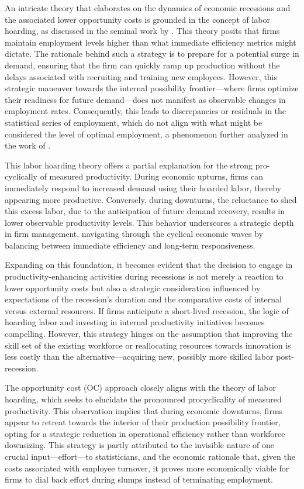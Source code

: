 \documentclass[12pt]{report}
\begin{document}
An intricate theory that elaborates on the dynamics of economic recessions and the associated lower opportunity costs is
grounded in the concept of labor hoarding, as discussed in the seminal work by  \cite{Cla73}. This theory posits
that firms maintain employment levels higher than what immediate efficiency metrics might dictate. The rationale behind
such a strategy is to prepare for a potential surge in demand, ensuring that the firm can quickly ramp up production
without the delays associated with recruiting and training new employees. However, this strategic maneuver towards the
internal possibility frontier—where firms optimize their readiness for future demand—does not manifest as observable
changes in employment rates. Consequently, this leads to discrepancies or residuals in the statistical series of
employment, which do not align with what might be considered the level of optimal employment, a phenomenon further
analyzed in the work of \cite{BurnCrai93}. 

This labor hoarding theory offers a partial explanation for the strong pro-cyclically of measured productivity. During
economic upturns, firms can immediately respond to increased demand using their hoarded labor, thereby appearing more
productive. Conversely, during downturns, the reluctance to shed this excess labor, due to the anticipation of future
demand recovery, results in lower observable productivity levels. This behavior underscores a strategic depth in firm
management, navigating through the cyclical economic waves by balancing between immediate efficiency and long-term
responsiveness. 

Expanding on this foundation, it becomes evident that the decision to engage in productivity-enhancing activities during
recessions is not merely a reaction to lower opportunity costs but also a strategic consideration influenced by
expectations of the recession's duration and the comparative costs of internal versus external resources. If firms
anticipate a short-lived recession, the logic of hoarding labor and investing in internal productivity initiatives
becomes compelling. However, this strategy hinges on the assumption that improving the skill set of the existing
workforce or reallocating resources towards innovation is less costly than the alternative—acquiring new, possibly more
skilled labor post-recession. 

The opportunity cost (OC) approach closely aligns with the theory of labor hoarding, which seeks to elucidate the
pronounced procyclicality of measured productivity. This observation implies that during economic downturns, firms
appear to retreat towards the interior of their production possibility frontier, opting for a strategic reduction in
operational efficiency rather than workforce downsizing. This strategy is partly attributed to the invisible nature of
one crucial input—effort—to statisticians, and the economic rationale that, given the costs associated with employee
turnover, it proves more economically viable for firms to dial back effort during slumps instead of terminating
employment. 
\end{document}
